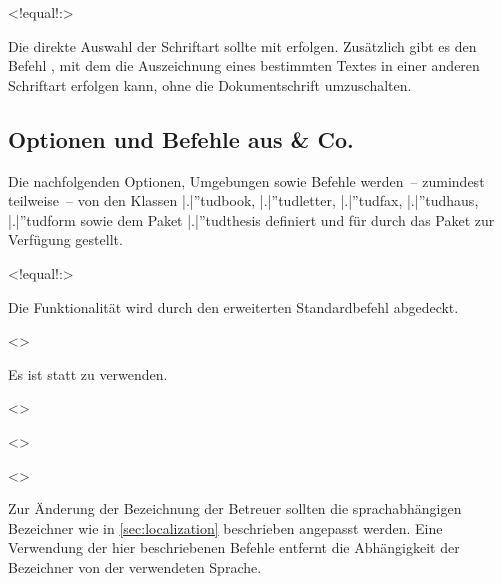 \begin{DeclareEntity}{}
\begin{NoIndexDefault}
\begin{Declaration}
  {}
  <!equal!:>
\printdeclarationlist

Die direkte Auswahl der Schriftart sollte mit  erfolgen. 
Zusätzlich gibt es den Befehl , mit dem die Auszeichnung 
eines bestimmten Textes in einer anderen Schriftart erfolgen kann, ohne die 
Dokumentschrift umzuschalten.
\end{Declaration}
%



\subsection{Optionen und Befehle aus  \& Co.}

Die nachfolgenden Optionen, Umgebungen sowie Befehle werden~-- zumindest 
teilweise~-- von den Klassen \Class|.|''{tudbook}, \Class|.|''{tudletter}, 
\Class|.|''{tudfax}, \Class|.|''{tudhaus}, \Class|.|''{tudform} sowie dem Paket 
\Package|.|''{tudthesis} definiert und für \vTUDScript*{\TUDScript} durch das 
Paket  zur Verfügung gestellt.

\begin{Declaration}
  {}
  <!equal!:>
\printdeclarationlist

Die Funktionalität wird durch den erweiterten Standardbefehl  
abgedeckt.
\end{Declaration}

\begin{Declaration}
  {}
  <>
\printdeclarationlist

Es ist 
statt  zu verwenden.
\end{Declaration}

\begin{Declaration}
  {}
  <>
\begin{Declaration}
  {}
  <>
\begin{Declaration}
  {}
  <>
\printdeclarationlist

Zur Änderung der Bezeichnung der Betreuer sollten die sprachabhängigen 
Bezeichner wie in \autoref{sec:localization} beschrieben angepasst werden. Eine 
Verwendung der hier beschriebenen Befehle entfernt die Abhängigkeit der 
Bezeichner von der verwendeten Sprache.
\end{Declaration}
\end{Declaration}
\end{Declaration}


\end{NoIndexDefault}
\end{DeclareEntity}
